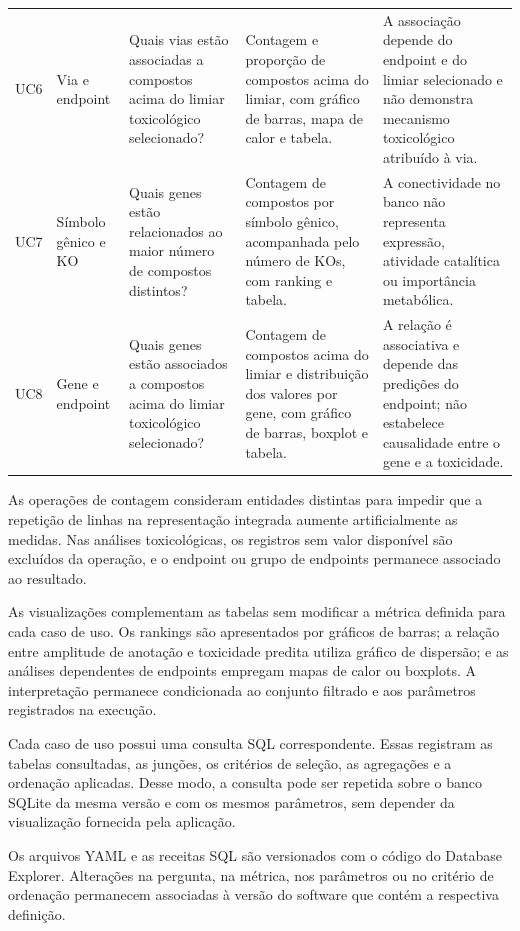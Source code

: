 \begin{table}[htbp]
\begin{tabularx}{\textwidth}{
    @{}
    p{0.65cm}
    p{1.65cm}
    p{3.45cm}
    p{4.35cm}
    X
    @{}
}
UC6
& Via e endpoint
& Quais vias estão associadas a compostos acima do limiar toxicológico
selecionado?
& Contagem e proporção de compostos acima do limiar, com gráfico de barras,
mapa de calor e tabela.
& A associação depende do endpoint e do limiar selecionado e não demonstra
mecanismo toxicológico atribuído à via. \\

UC7
& Símbolo gênico e KO
& Quais genes estão relacionados ao maior número de compostos distintos?
& Contagem de compostos por símbolo gênico, acompanhada pelo número de KOs,
com ranking e tabela.
& A conectividade no banco não representa expressão, atividade catalítica ou
importância metabólica. \\

UC8
& Gene e endpoint
& Quais genes estão associados a compostos acima do limiar toxicológico
selecionado?
& Contagem de compostos acima do limiar e distribuição dos valores por gene,
com gráfico de barras, boxplot e tabela.
& A relação é associativa e depende das predições do endpoint; não estabelece
causalidade entre o gene e a toxicidade. \\

\bottomrule
\end{tabularx}
\end{table}

As operações de contagem consideram entidades distintas para impedir que a
repetição de linhas na representação integrada aumente artificialmente as
medidas. Nas análises toxicológicas, os registros sem valor disponível são
excluídos da operação, e o endpoint ou grupo de endpoints permanece associado
ao resultado.

As visualizações complementam as tabelas sem modificar a métrica definida para
cada caso de uso. Os rankings são apresentados por gráficos de barras; a
relação entre amplitude de anotação e toxicidade predita utiliza gráfico de
dispersão; e as análises dependentes de endpoints empregam mapas de calor ou
boxplots. A interpretação permanece condicionada ao conjunto filtrado e aos
parâmetros registrados na execução.

Cada caso de uso possui uma consulta SQL correspondente. Essas registram as tabelas consultadas, as junções, os critérios de seleção, as
agregações e a ordenação aplicadas. Desse modo, a consulta pode ser repetida
sobre o banco SQLite da mesma versão e com os mesmos parâmetros, sem depender
da visualização fornecida pela aplicação.

Os arquivos YAML e as receitas SQL são versionados com o código do Database
Explorer. Alterações na pergunta, na métrica, nos parâmetros ou no critério de
ordenação permanecem associadas à versão do software que contém a respectiva
definição.

